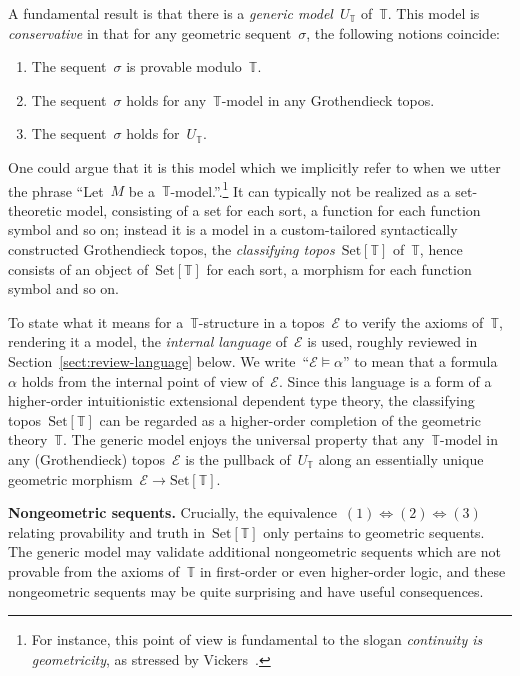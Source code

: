 \documentclass[oneside,reqno]{amsart}
\theoremstyle{definition}
\theoremstyle{plain}
\theoremstyle{remark}
\newcommand{\E}{\mathcal{E}}
\newcommand{\TT}{\mathbb{T}}
\newcommand{\Set}{\mathrm{Set}}
\renewcommand{\_}{\mathpunct{.}\,}
\newcommand{\?}{\,{:}\,}
\renewcommand{\paragraph}[1]{\noindent\textbf{#1.}}
\begin{document}
A fundamental result is that there is a \emph{generic model}~$U_\TT$ of~$\TT$.
This model is \emph{conservative} in that
for any geometric sequent~$\sigma$, the following notions
coincide:
\begin{enumerate}
\item The sequent~$\sigma$ is provable modulo~$\TT$.
\item The sequent~$\sigma$ holds for any~$\TT$-model in any Grothendieck topos.
\item The sequent~$\sigma$ holds for~$U_\TT$.
\end{enumerate}
One could argue that it is this model which we
implicitly refer to when we utter the phrase ``Let~$M$ be
a~$\TT$-model.''.\footnote{For instance, this point of view is fundamental to
the slogan \emph{continuity is geometricity}, as stressed by
Vickers~\cite{vickers:continuity}.}
It can
typically not be realized as a set-theoretic model, consisting of a set for
each sort, a function for each function symbol and so on; instead it is a model
in a custom-tailored syntactically constructed Grothendieck topos, the
\emph{classifying topos}~$\Set[\TT]$ of~$\TT$, hence consists of an object
of~$\Set[\TT]$ for each sort, a morphism for each function symbol and so on.

To state what it means for a~$\TT$-structure in a topos~$\E$ to verify the
axioms of~$\TT$, rendering it a model, the \emph{internal language} of~$\E$ is
used, roughly reviewed in Section~\ref{sect:review-language} below. We write~``$\E
\models \alpha$'' to mean that a formula~$\alpha$ holds from the internal
point of view of~$\E$. Since this language is a form of a higher-order
intuitionistic extensional dependent type theory, the classifying topos~$\Set[\TT]$ can
be regarded as a higher-order completion of the geometric theory~$\TT$. The
generic model enjoys the universal property that any~$\TT$-model in any
(Grothendieck) topos~$\E$ is the pullback of~$U_\TT$ along an essentially
unique geometric morphism~$\E \to \Set[\TT]$.
\medskip

\paragraph{Nongeometric sequents} Crucially, the
equivalence~$(1)\Leftrightarrow(2)\Leftrightarrow(3)$ relating
provability and truth in~$\Set[\TT]$ only pertains to geometric sequents. The
generic model may validate additional nongeometric sequents which are not
provable from the axioms of~$\TT$ in first-order or even higher-order logic,
and these nongeometric sequents may be quite surprising and have useful
consequences.
\end{document}
